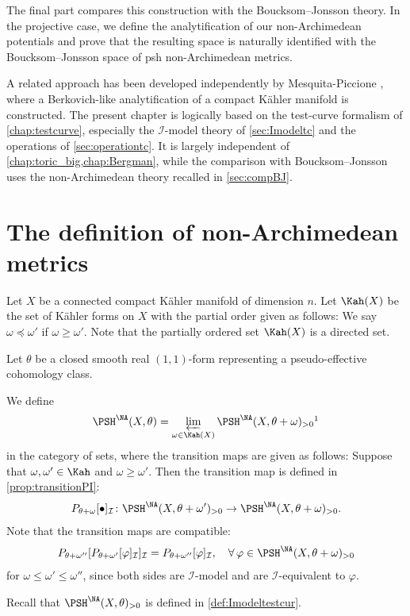 The final part compares this construction with the Boucksom--Jonsson theory. In the projective case, we define the analytification of our non-Archimedean potentials and prove that the resulting space is naturally identified with the Boucksom--Jonsson space of psh non-Archimedean metrics.

A related approach has been developed independently by Mesquita-Piccione \cite{MP24}, where a Berkovich-like analytification of a compact K\"ahler manifold is constructed. The present chapter is logically based on the test-curve formalism of \cref{chap:testcurve}, especially the $\mathcal I$-model theory of \cref{sec:Imodeltc} and the operations of \cref{sec:operationtc}. It is largely independent of \cref{chap:toric_big,chap:Bergman}, while the comparison with Boucksom--Jonsson uses the non-Archimedean theory recalled in \cref{sec:compBJ}.

\section{The definition of non-Archimedean metrics}\label{sec:nAm_def}
Let $X$ be a connected compact K\"ahler manifold of dimension $n$.
Let $\Kah(X)$ be the set of K\"ahler forms on $X$ with the partial order given as follows: We say $\omega\preceq \omega'$ if $\omega\geq \omega'$. Note that the partially ordered set $\Kah(X)$ is a directed set.

Let $\theta$ be a closed smooth real $(1,1)$-form representing a pseudo-effective cohomology class.
\begin{definition}\label{def:NApotential:L24}
    We define
    \[
        \PSH^{\NA}(X,\theta)=\varprojlim_{\omega\in \Kah(X)} \PSH^{\NA}(X,\theta+\omega)_{>0}\footnotemark
    \]
     
    in the category of sets, where the transition maps are given as follows: Suppose that $\omega,\omega'\in \Kah$ and $\omega\geq \omega'$. Then the transition map is defined in \cref{prop:transitionPI}:
    \begin{equation}\label{eq:PItransPSHNApositive}
        P_{\theta+\omega}[\bullet]_{\mathcal{I}}\colon \PSH^{\NA}(X,\theta+\omega')_{>0}\rightarrow \PSH^{\NA}(X,\theta+\omega)_{>0}.
    \end{equation}
    Note that the transition maps are compatible:
    \[
    P_{\theta+\omega''}[P_{\theta+\omega'}[\varphi]_\mathcal{I}]_\mathcal{I}=P_{\theta+\omega''}[\varphi]_\mathcal{I},\quad \forall \, \varphi\in \PSH^{\NA}(X,\theta+\omega)_{>0}
    \]
    for $\omega\leq\omega'\leq\omega''$, since both sides are $\mathcal{I}$-model and are $\mathcal{I}$-equivalent to $\varphi$.
\end{definition}
Recall that $\PSH^{\NA}(X,\theta)_{>0}$ is defined in \cref{def:Imodeltestcur}.

